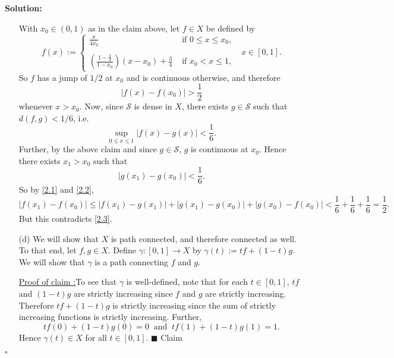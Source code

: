 \documentclass[12pt]{article}
\newcounter{ProofCounter}
\newcounter{ClaimCounter}[ProofCounter]
\newenvironment{Solution}{\stepcounter{ProofCounter}\textbf{Solution:}}{\hfill$\square$}
\newenvironment{claim}[1]{\vspace{1mm}\stepcounter{ClaimCounter}\par\noindent\underline{\bf Claim \theClaimCounter:}\space#1}{}
\newenvironment{claimproof}[1]{\par\noindent\underline{Proof of claim \theClaimCounter:}\space#1}{\hfill $\blacksquare$ Claim \theClaimCounter}
\begin{document}
\begin{Solution}
\begin{enumerate}
      With $x_0 \in (0,1)$ as in the claim above, let $f \in X$ be defined by
      \[
        f(x) := \left\{ \begin{array}{cl}
            \frac{x}{4x_0} & \text{ if } 0 \leq x \leq x_0, \\ \\
            \left( \frac{1-\frac{3}{4}}{1-x_0} \right)(x - x_0) + \frac{3}{4} & \text{ if } x_0 < x \leq 1,
          \end{array}
        \right. \ \ \  x \in [0,1].
      \]
      So $f$ has a jump of $1/2$ at $x_0$ and is continuous otherwise, and therefore 
      \begin{equation}
        |f(x) - f(x_0)| > \frac{1}{2}
        \label{2.3}
      \end{equation}
      whenever $x > x_0$.
      Now, since $\mathcal{S}$ is dense in $X$, there exists $g \in \mathcal{S}$ such
      that $d(f,g) < 1/6$, i.e. 
      \begin{equation}
        \sup_{0\leq x\leq 1}|f(x) - g(x)| < \frac{1}{6}.
        \label{2.1}
      \end{equation}
      Further, by the above claim and since $g \in \mathcal{S}$, $g$ is continuous at $x_0$. Hence there exists $x_1 > x_0$ such that 
      \begin{equation}
        |g(x_1) - g(x_0)| < \frac{1}{6}.
        \label{2.2}
      \end{equation}
      So by \eqref{2.1} and \eqref{2.2}, 
      \[
        |f(x_1) - f(x_0)| \leq |f(x_1) - g(x_1)| + |g(x_1) - g(x_0)| + |g(x_0) - f(x_0)| < \frac{1}{6} + \frac{1}{6} + \frac{1}{6} = \frac{1}{2}.
      \]
      But this contradicts \eqref{2.3}.
      

    \item[(d)] We will show that $X$ is path connected, and therefore connected as well. To that end, let $f, g \in X$. Define $\gamma : [0,1]
      \rightarrow X$ by $\gamma(t) := t f + (1 - t) g$. We will show that $\gamma$ is a path connecting $f$ and $g$.

      \begin{claimproof}
        To see that $\gamma$ is well-defined, note that for each $t \in [0,1]$, $t f$ and $(1 - t)g$
        are strictly increasing since $f$ and $g$ are strictly increasing. Therefore $t f + (1-t) g$ is strictly increasing since the sum of strictly increasing
        functions is strictly increasing. Further, 
        \[
          t f(0) + (1- t)g(0) = 0 \ \text{  and  }\ t f(1) + (1-t) g(1) = 1. 
        \]
        Hence $\gamma(t) \in X$ for all $t \in [0,1]$.
      \end{claimproof}


\end{enumerate}
\end{Solution}
\end{document}
